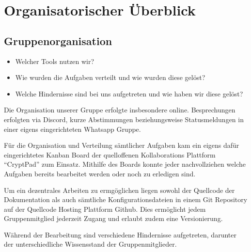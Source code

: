 \section{Organisatorischer Überblick}

\subsection{Gruppenorganisation}

\begin{itemize}
    \item Welcher Tools nutzen wir?
    \item Wie wurden die Aufgaben verteilt und wie wurden diese gelöst?
    \item Welche Hindernisse sind bei uns aufgetreten und wie haben wir diese gelöst?
\end{itemize}

Die Organisation unserer Gruppe erfolgte insbesondere online. Besprechungen erfolgten via Discord, kurze Abstimmungen beziehungsweise Statusmeldungen in einer eigens eingerichteten Whatsapp Gruppe.

Für die Organisation und Verteilung sämtlicher Aufgaben kam ein eigens dafür eingerichtetes Kanban Board der quelloffenen Kollaborations Plattform \enquote{CryptPad} zum Einsatz. Mithilfe des Boards konnte jeder nachvollziehen welche Aufgaben bereits bearbeitet werden oder noch zu erledigen sind.

Um ein dezentrales Arbeiten zu ermgöglichen liegen sowohl der Quellcode der Dokumentation als auch sämtliche Konfigurationsdateien in einem Git Repository auf der Quellcode Hosting Plattform Github. Dies ermöglicht jedem Gruppenmitglied jederzeit Zugang und erlaubt zudem eine Versionierung.

Während der Bearbeitung sind verschiedene Hindernisse aufgetreten, darunter der unterschiedliche Wissensstand der Gruppenmitglieder.